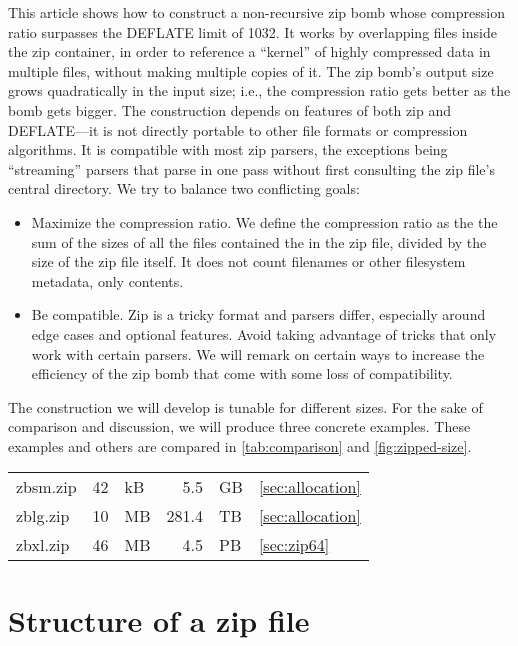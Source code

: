 \documentclass[letterpaper,twocolumn,10pt]{article}
\begin{document}
This article shows how to construct a non-recursive zip bomb
whose compression ratio surpasses the DEFLATE limit of 1032.
It works by overlapping files inside the zip container,
in order to reference a ``kernel'' of highly compressed data
in multiple files, without making multiple copies of it.
The zip bomb's output size grows quadratically in the input size; i.e.,
the compression ratio gets better as the bomb gets bigger.
The construction depends on features of both zip and DEFLATE---it
is not directly portable to other file formats or compression algorithms.
It is compatible with most zip parsers,
the exceptions being ``streaming'' parsers that
parse in one pass without first consulting the zip file's central directory.
We try to balance
two conflicting goals:
\begin{itemize}
\item
Maximize the compression ratio.
We define the compression ratio as the the sum of the sizes
of all the files contained the in the zip file,
divided by the size of the zip file itself.
It does not count filenames or other filesystem metadata,
only contents.
\item
Be compatible.
Zip is a tricky format and parsers differ, especially
around edge cases and optional features.
Avoid taking advantage of tricks that only work with certain parsers.
We will remark on certain ways to increase the efficiency of the zip bomb
that come with some loss of compatibility.
\end{itemize}

The construction we will develop is tunable for different sizes.
For the sake of comparison and discussion,
we will produce three concrete examples.
These examples and others are compared in \autoref{tab:comparison}
and \autoref{fig:zipped-size}.

\begin{center}
\begin{tabular}{lr@{~}l@{${} \rightarrow {}$}r@{~}ll}
zbsm.zip & \num{42} & kB & \num{5.5}   & GB & \autoref{sec:allocation} \\
zblg.zip & \num{10} & MB & \num{281.4} & TB & \autoref{sec:allocation} \\
zbxl.zip & \num{46} & MB & \num{4.5}   & PB & \autoref{sec:zip64}
\end{tabular}
\end{center}


\section{Structure of a zip file}
\label{sec:zipstructure}
\end{document}
